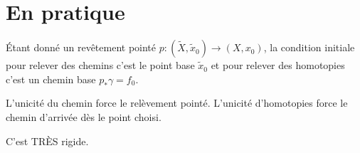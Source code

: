 \documentclass[a4paper,12pt]{article}
\theoremstyle{plain}
\theoremstyle{definition}
\theoremstyle{remark}
\begin{document}
\section{En pratique}
Étant donné un revêtement pointé 
$p\colon(\tilde X, \tilde x_0)\to (X,x_0)$,
la condition initiale pour relever des chemins c'est le point base $\tilde x_0$
et pour relever des homotopies c'est un chemin base $p_*\gamma=f_0$.

L'unicité du chemin force le relèvement pointé. L'unicité
d'homotopies force le chemin d'arrivée dès le point
choisi.

C'est TRÈS rigide.

\end{document}
